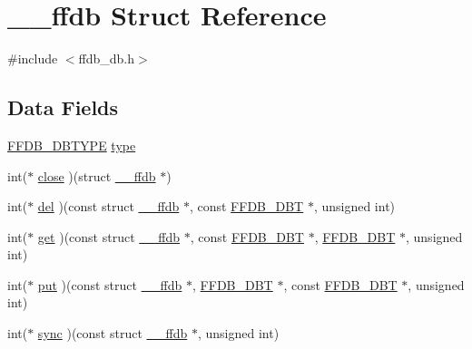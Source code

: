 \hypertarget{struct____ffdb}{}\section{\+\_\+\+\_\+ffdb Struct Reference}
\label{struct____ffdb}


{\ttfamily \#include $<$ffdb\+\_\+db.\+h$>$}

\subsection*{Data Fields}
\begin{DoxyCompactItemize}
\item 
\mbox{\hyperlink{other__libs_2filedb_2filehash_2ffdb__db_8h_ad525b587adc6d7028c6f7bf7e8204185}{F\+F\+D\+B\+\_\+\+D\+B\+T\+Y\+PE}} \mbox{\hyperlink{struct____ffdb_a97cc74bb16c35a0a927331f4e2aa0734}{type}}
\item 
int($\ast$ \mbox{\hyperlink{struct____ffdb_a5619a53c055a8822d1ee1f75eb5308f6}{close}} )(struct \mbox{\hyperlink{struct____ffdb}{\+\_\+\+\_\+ffdb}} $\ast$)
\item 
int($\ast$ \mbox{\hyperlink{struct____ffdb_a88791473b56c4423cc6599c92f960973}{del}} )(const struct \mbox{\hyperlink{struct____ffdb}{\+\_\+\+\_\+ffdb}} $\ast$, const \mbox{\hyperlink{other__libs_2filedb_2filehash_2ffdb__db_8h_aa2e0984399491df0fdd20898ca8758f9}{F\+F\+D\+B\+\_\+\+D\+BT}} $\ast$, unsigned int)
\item 
int($\ast$ \mbox{\hyperlink{struct____ffdb_a8a7764381b955beff42d80df7d895f15}{get}} )(const struct \mbox{\hyperlink{struct____ffdb}{\+\_\+\+\_\+ffdb}} $\ast$, const \mbox{\hyperlink{other__libs_2filedb_2filehash_2ffdb__db_8h_aa2e0984399491df0fdd20898ca8758f9}{F\+F\+D\+B\+\_\+\+D\+BT}} $\ast$, \mbox{\hyperlink{other__libs_2filedb_2filehash_2ffdb__db_8h_aa2e0984399491df0fdd20898ca8758f9}{F\+F\+D\+B\+\_\+\+D\+BT}} $\ast$, unsigned int)
\item 
int($\ast$ \mbox{\hyperlink{struct____ffdb_a63b3f6dcb802e3ed86921fd618eeee52}{put}} )(const struct \mbox{\hyperlink{struct____ffdb}{\+\_\+\+\_\+ffdb}} $\ast$, \mbox{\hyperlink{other__libs_2filedb_2filehash_2ffdb__db_8h_aa2e0984399491df0fdd20898ca8758f9}{F\+F\+D\+B\+\_\+\+D\+BT}} $\ast$, const \mbox{\hyperlink{other__libs_2filedb_2filehash_2ffdb__db_8h_aa2e0984399491df0fdd20898ca8758f9}{F\+F\+D\+B\+\_\+\+D\+BT}} $\ast$, unsigned int)
\item 
int($\ast$ \mbox{\hyperlink{struct____ffdb_ac62e77f33be0e087840288a34afa7505}{sync}} )(const struct \mbox{\hyperlink{struct____ffdb}{\+\_\+\+\_\+ffdb}} $\ast$, unsigned int)

\end{DoxyCompactItemize}
